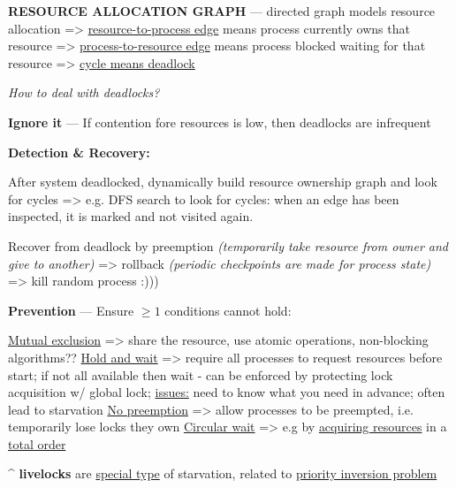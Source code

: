 
\textbf{RESOURCE ALLOCATION GRAPH} — directed graph models resource allocation =>
\ul{resource-to-process edge} means process currently owns that resource =>
\ul{process-to-resource edge} means process blocked waiting for that resource =>
\ul{cycle means deadlock}

\hSep

\textit{How to deal with deadlocks?}

\textbf{Ignore it} — If contention fore resources is low, then deadlocks are infrequent

\textbf{Detection \& Recovery:}
\begin{enumerate}
    \vItem After system deadlocked, dynamically build resource ownership graph and look for cycles
    => e.g. DFS search to look for cycles: when an edge has been inspected, it is marked and not visited again.

    \vItem Recover from deadlock by preemption \textit{(temporarily take resource from owner and give to another)}
    => rollback \textit{(periodic checkpoints are made for process state)} => kill random process :)))
\end{enumerate}


\textbf{Prevention} — Ensure $\geq 1$ conditions cannot hold:
\begin{enumerate}
    \vItem \ul{Mutual exclusion} => share the resource, use atomic operations, non-blocking algorithms??
    \vItem \ul{Hold and wait} => 
    require all processes to request resources before start; if not all available then wait - can
    be enforced by protecting lock acquisition w/ global lock; \ul{issues:}
    need to know what you need in advance; often lead to starvation
    \vItem \ul{No preemption} => allow processes to be preempted, i.e. temporarily lose locks they own
    \vItem \ul{Circular wait} => e.g by \ul{acquiring resources} in a \ul{total order}
\end{enumerate}

\^{} \textbf{livelocks} are \ul{special type} of starvation, related to \ul{priority inversion problem}

\hSep